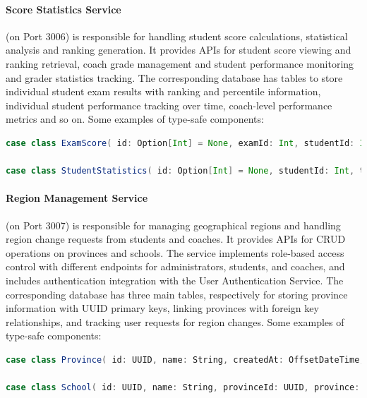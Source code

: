 \documentclass[12pt]{article}
\begin{document}
\paragraph{Score Statistics Service} (on Port 3006) is responsible for handling student score calculations, statistical analysis and ranking generation. It provides APIs for student score viewing and ranking retrieval, coach grade management and student performance monitoring and grader statistics tracking. The corresponding database has tables to store individual student exam results with ranking and percentile information, individual student performance tracking over time, coach-level performance metrics and so on. Some examples of type-safe components:

\begin{lstlisting}[language=Scala]
case class ExamScore( id: Option[Int] = None, examId: Int, studentId: Int, totalScore: Double, questionScores: Map[String, Double] = Map.empty, rankPosition: Int = 0, percentile: Double = 0.0, createdAt: Option[LocalDateTime] = None, updatedAt: Option[LocalDateTime] = None )

case class StudentStatistics( id: Option[Int] = None, studentId: Int, totalExams: Int, averageScore: Double, bestScore: Double, worstScore: Double, improvementTrend: Double, strongSubjects: List[String] = List.empty, weakSubjects: List[String] = List.empty, createdAt: Option[LocalDateTime] = None, updatedAt: Option[LocalDateTime] = None )
\end{lstlisting}

\paragraph{Region Management Service} (on Port 3007) is responsible for managing geographical regions and handling region change requests from students and coaches. It provides APIs for CRUD operations on provinces and schools. The service implements role-based access control with different endpoints for administrators, students, and coaches, and includes authentication integration with the User Authentication Service. The corresponding database has three main tables, respectively for storing province information with UUID primary keys, linking provinces with foreign key relationships, and tracking user requests for region changes. Some examples of type-safe components:

\begin{lstlisting}[language=Scala]
case class Province( id: UUID, name: String, createdAt: OffsetDateTime, updatedAt: OffsetDateTime )

case class School( id: UUID, name: String, provinceId: UUID, province: Option[Province] = None, createdAt: OffsetDateTime, updatedAt: OffsetDateTime )
\end{lstlisting}
\end{document}
